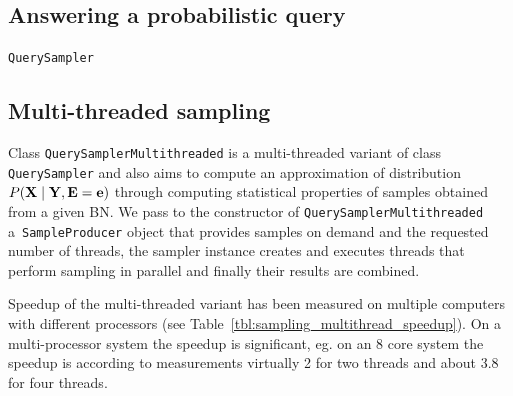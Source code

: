 \documentclass[english,cover]{fitthesis} %
\newcommand{\srccode}[1]{{\tt #1}}         %
\newcommand{\vars}[1]{{\bold{#1}}}         %
\begin{document}
\subsection{Answering a probabilistic query}
\srccode{QuerySampler}


\subsection{Multi-threaded sampling}
Class \srccode{QuerySamplerMultithreaded} is a multi-threaded variant of class \srccode{QuerySampler} and also aims to compute an approximation of distribution $P(\vars{X} \mid \vars{Y}, \vars{E} = \vars{e})$ through computing statistical properties of samples obtained from a given BN. We pass to the constructor of \srccode{QuerySamplerMultithreaded} a~\srccode{SampleProducer} object that provides samples on demand and the requested number of threads, the sampler instance creates and executes threads that perform sampling in parallel and finally their results are combined.

Speedup of the multi-threaded variant has been measured on multiple computers with different processors (see Table~\ref{tbl:sampling_multithread_speedup}). On a multi-processor system the speedup is significant, eg. on an 8 core system the speedup is according to measurements virtually 2 for two threads and about 3.8 for four threads.
\end{document}
